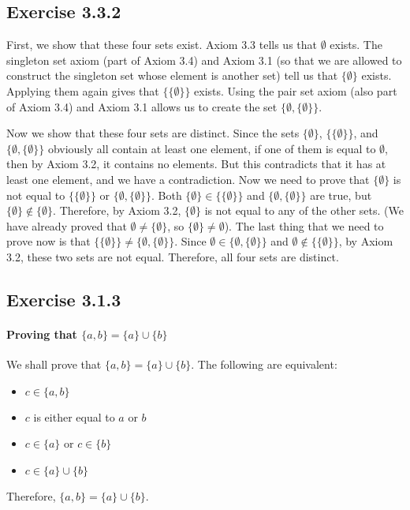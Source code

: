 \documentclass[12pt, oneside]{book}
\begin{document}
	\subsection*{Exercise 3.3.2}
	
	First, we show that these four sets exist. Axiom 3.3 tells us that $\emptyset$ exists. The singleton set axiom (part of Axiom 3.4) and Axiom 3.1 (so that we are allowed to construct the singleton set whose element is another set) tell us that $\{\emptyset\}$ exists. Applying them again gives that $\{\{\emptyset\}\}$ exists. Using the pair set axiom (also part of Axiom 3.4) and Axiom 3.1 allows us to create the set $\{\emptyset, \{\emptyset\}\}$.
	
	Now we show that these four sets are distinct. Since the sets $\{\emptyset\}$, $\{\{\emptyset\}\}$, and $\{\emptyset, \{\emptyset\}\}$ obviously all contain at least one element, if one of them is equal to $\emptyset$, then by Axiom 3.2, it contains no elements. But this contradicts that it has at least one element, and we have a contradiction. Now we need to prove that $\{\emptyset\}$ is not equal to $\{\{\emptyset\}\}$ or $\{\emptyset, \{\emptyset\}\}$. Both $\{\emptyset\} \in \{\{\emptyset\}\}$ and $\{\emptyset, \{\emptyset\}\}$ are true, but $\{\emptyset\} \notin \{\emptyset\}$. Therefore, by Axiom 3.2, $\{\emptyset\}$ is not equal to any of the other sets. (We have already proved that $\emptyset \ne \{\emptyset\}$, so $\{\emptyset\} \ne \emptyset$). The last thing that we need to prove now is that $\{\{\emptyset\}\} \ne \{\emptyset, \{\emptyset\}\}$. Since $\emptyset \in \{\emptyset, \{\emptyset\}\}$ and $\emptyset \notin \{\{\emptyset\}\}$, by Axiom 3.2, these two sets are not equal. Therefore, all four sets are distinct.
	
	\subsection*{Exercise 3.1.3}
	
	\paragraph*{Proving that $\{a, b\} = \{a\} \cup \{b\}$}
	
	We shall prove that $\{a, b\} = \{a\} \cup \{b\}$. The following are equivalent:
	\begin{itemize}
		\item $c \in \{a, b\}$
		\item $c$ is either equal to $a$ or $b$
		\item $c \in \{a\}$ or $c \in \{b\}$
		\item $c \in \{a\} \cup \{b\}$
	\end{itemize}
	Therefore, $\{a, b\} = \{a\} \cup \{b\}$.
	
\end{document}
